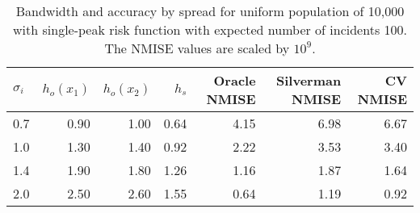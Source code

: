 \begin{table}[ht]
\centering
\begin{tabular}{lrrrrrr}
  \hline
$\sigma_i$ & $h_{o}(x_1)$ & $h_{o}(x_2)$ & $h_{s}$ & Oracle NMISE & Silverman NMISE & CV NMISE \\ 
  \hline
0.7 & 0.90 & 1.00 & 0.64 & 4.15 & 6.98 & 6.67 \\ 
  1.0 & 1.30 & 1.40 & 0.92 & 2.22 & 3.53 & 3.40 \\ 
  1.4 & 1.90 & 1.80 & 1.26 & 1.16 & 1.87 & 1.64 \\ 
  2.0 & 2.50 & 2.60 & 1.55 & 0.64 & 1.19 & 0.92 \\ 
   \hline
\end{tabular}
\caption[Bandwidth and accuracy by spread of incidents]{Bandwidth and accuracy by spread for uniform population of 10,000 with single-peak risk function with expected number of incidents 100. The NMISE values are scaled by $10^9$.} 
\label{tab:results:bandwidth_vs_mu}
\end{table}
